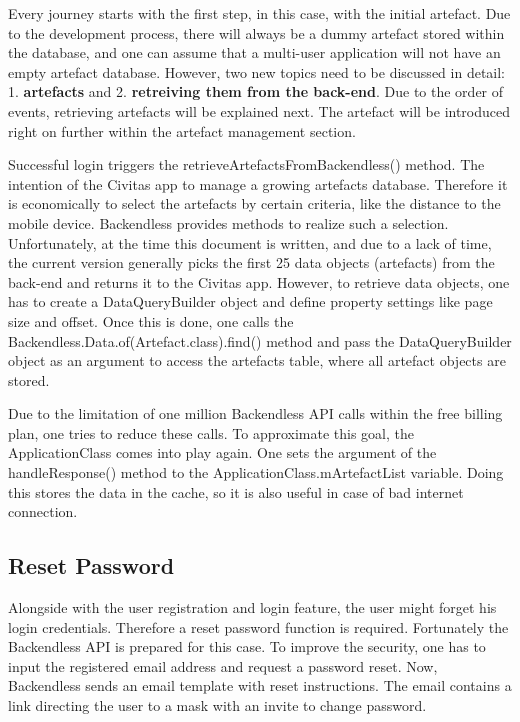 Every journey starts with the first step, in this case, with the initial artefact. Due to the development process, there will always be a dummy artefact stored within the database, and one can assume that a multi-user application will not have an empty artefact database. However, two new topics need to be discussed in detail: 1. \textbf{artefacts} and 2. \textbf{retreiving them from the back-end}.
Due to the order of events, retrieving artefacts will be explained next. The artefact will be introduced right on further within the artefact management section.

Successful login triggers the retrieveArtefactsFromBackendless() method. The intention of the Civitas app to manage a growing artefacts database. Therefore it is economically to select the artefacts by certain criteria, like the distance to the mobile device. Backendless provides methods to realize such a selection. Unfortunately, at the time this document is written, and due to a lack of time, the current version generally picks the first 25 data objects (artefacts) from the back-end and returns it to the Civitas app. 
However, to retrieve data objects, one has to create a DataQueryBuilder object and define property settings like page size and offset. Once this is done, one calls the Backendless.Data.of(Artefact.class).find() method and pass the DataQueryBuilder object as an argument to access the artefacts table, where all artefact objects are stored.


Due to the limitation of one million Backendless API calls within the free billing plan, one tries to reduce these calls. To approximate this goal, the ApplicationClass comes into play again. One sets the argument of the handleResponse() method to the ApplicationClass.mArtefactList variable. Doing this stores the data in the cache, so it is also useful in case of bad internet connection.

\subsection{Reset Password}
Alongside with the user registration and login feature, the user might forget his login credentials. Therefore a reset password function is required. Fortunately the Backendless API is prepared for this case. To improve the security, one has to input the registered email address and request a password reset. Now, Backendless sends an email template with reset instructions. The email contains a link directing the user to a mask with an invite to change password.

